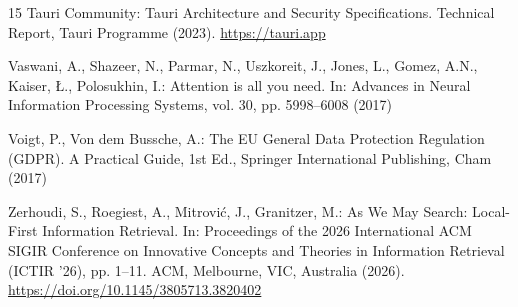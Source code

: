 \documentclass[pdflatex,sn-mathphys-num]{sn-jnl}%
\theoremstyle{thmstyleone}%
\theoremstyle{thmstyletwo}%
\theoremstyle{thmstylethree}%
\begin{document}
\begin{thebibliography}{15}
Tauri Community: Tauri Architecture and Security Specifications. Technical Report, Tauri Programme (2023). \url{https://tauri.app}

Vaswani, A., Shazeer, N., Parmar, N., Uszkoreit, J., Jones, L., Gomez, A.N., Kaiser, {\L}., Polosukhin, I.: Attention is all you need. In: Advances in Neural Information Processing Systems, vol. 30, pp. 5998--6008 (2017)

Voigt, P., Von dem Bussche, A.: The EU General Data Protection Regulation (GDPR). A Practical Guide, 1st Ed., Springer International Publishing, Cham (2017)

Zerhoudi, S., Roegiest, A., Mitrovi{\'c}, J., Granitzer, M.: As We May Search: Local-First Information Retrieval. In: Proceedings of the 2026 International ACM SIGIR Conference on Innovative Concepts and Theories in Information Retrieval (ICTIR '26), pp. 1--11. ACM, Melbourne, VIC, Australia (2026). \url{https://doi.org/10.1145/3805713.3820402}

\end{thebibliography}
\end{document}
